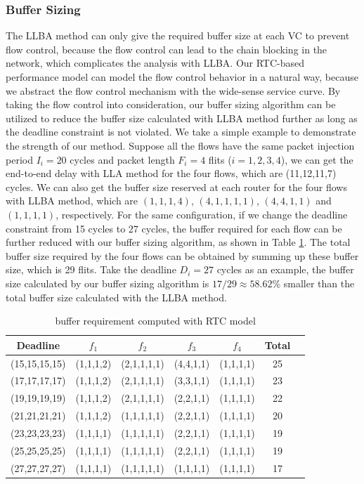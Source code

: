 \documentclass[10pt,journal]{IEEEtran}
\begin{document}
\subsubsection{Buffer Sizing}
The LLBA method \cite{189} can only give the required buffer size at each VC to prevent flow control, because the flow control can lead to the chain blocking in the network, which complicates the analysis with LLBA. Our RTC-based performance model can model the flow control behavior in a natural way, because we abstract the flow control mechanism with the wide-sense service curve. By taking the flow control into consideration, our buffer sizing algorithm can be utilized to reduce the buffer size calculated with LLBA method further as long as the deadline constraint is not violated. We take a simple example to demonstrate the strength of our method. Suppose all the flows have the same packet injection period $I_i=20$ cycles and packet length $F_i=4$ flits ($i=1,2,3,4$), we can get the end-to-end delay with LLA method for the four flows, which are (11,12,11,7) cycles. We can also get the buffer size reserved at each router for the four flows with LLBA method, which are $(1,1,1,4)$, $(4,1,1,1,1)$, $(4,4,1,1)$ and $(1,1,1,1)$, respectively. For the same configuration, if we change the deadline constraint from 15 cycles to 27 cycles, the buffer required for each flow can be further reduced with our buffer sizing algorithm, as shown in Table \ref{LLBAvsRTC}. The total buffer size required by the four flows can be obtained by summing up these buffer size, which is 29 flits. Take the deadline $D_i=27$ cycles as an example, the buffer size calculated by our buffer sizing algorithm is $17/29\approx58.62$\% smaller than the total buffer size calculated with the LLBA method.
\begin{table}[htbp]
\centering
\caption{\label{LLBAvsRTC}buffer requirement computed with RTC model}
\begin{tabular}{|c|c|c|c|c|c|c|}
\hline
Deadline  & $f_1$  &   $f_2$   &   $f_3$   &   $f_4$   &   Total\\
\hline
(15,15,15,15)   &   (1,1,1,2)   &   (2,1,1,1,1) &   (4,4,1,1)   &   (1,1,1,1)   &   25\\
\hline
(17,17,17,17)   &   (1,1,1,2)   &   (2,1,1,1,1) &   (3,3,1,1)   &   (1,1,1,1)   &   23\\
\hline
(19,19,19,19)   &   (1,1,1,2)   &   (2,1,1,1,1) &   (2,2,1,1)   &   (1,1,1,1)   &   22\\
\hline
(21,21,21,21)   &   (1,1,1,2)   &   (1,1,1,1,1) &   (2,2,1,1)   &   (1,1,1,1)   &   20\\
\hline
(23,23,23,23)   &   (1,1,1,1)   &   (1,1,1,1,1) &   (2,2,1,1)   &   (1,1,1,1)   &   19\\
\hline
(25,25,25,25)   &   (1,1,1,1)   &   (1,1,1,1,1) &   (2,2,1,1)   &   (1,1,1,1)   &   19\\
\hline
(27,27,27,27)   &   (1,1,1,1)   &   (1,1,1,1,1) &   (1,1,1,1)   &   (1,1,1,1)   &   17\\
\hline
\end{tabular}
\end{table}
\end{document}
